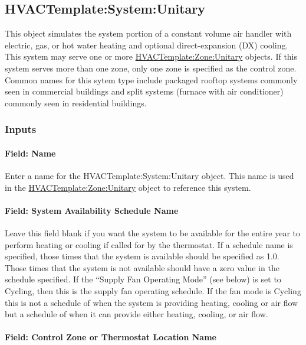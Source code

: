\subsection{HVACTemplate:System:Unitary}\label{hvactemplatesystemunitary}

This object simulates the system portion of a constant volume air handler with electric, gas, or hot water heating and optional direct-expansion (DX) cooling. This system may serve one or more \hyperref[hvactemplatezoneunitary]{HVACTemplate:Zone:Unitary} objects. If this system serves more than one zone, only one zone is specified as the control zone. Common names for this sytem type include packaged rooftop systems commonly seen in commercial buildings and split systems (furnace with air conditioner) commonly seen in residential buildings.

\subsubsection{Inputs}\label{inputs-15-005}

\paragraph{Field: Name}\label{field-name-2-019}

Enter a name for the HVACTemplate:System:Unitary object. This name is used in the \hyperref[hvactemplatezoneunitary]{HVACTemplate:Zone:Unitary} object to reference this system.

\paragraph{Field: System Availability Schedule Name}\label{field-system-availability-schedule-name-7}

Leave this field blank if you want the system to be available for the entire year to perform heating or cooling if called for by the thermostat. If a schedule name is specified, those times that the system is available should be specified as 1.0. Those times that the system is not available should have a zero value in the schedule specified. If the ``Supply Fan Operating Mode'' (see below) is set to Cycling, then this is the supply fan operating schedule. If the fan mode is Cycling this is not a schedule of when the system is providing heating, cooling or air flow but a schedule of when it can provide either heating, cooling, or air flow.

\paragraph{Field: Control Zone or Thermostat Location Name}\label{field-control-zone-or-thermostat-location-name}

